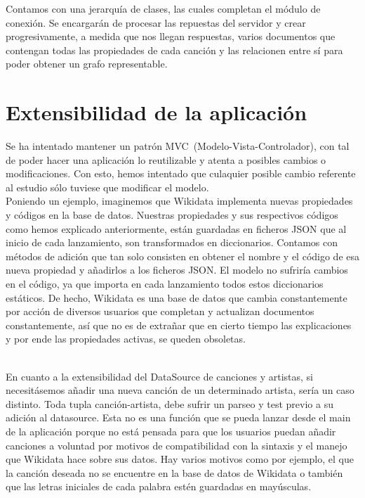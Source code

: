 Contamos con una jerarquía de clases, las cuales completan el módulo de conexión. Se encargarán de procesar las repuestas del servidor y crear progresivamente, a medida que nos llegan respuestas, varios documentos que contengan todas las propiedades de cada canción y las relacionen entre sí para poder obtener un grafo representable.\\

\section{Extensibilidad de la aplicación}

Se ha intentado mantener un patrón MVC~(Modelo-Vista-Controlador), con tal de poder hacer una aplicación lo reutilizable y atenta a posibles cambios o modificaciones. Con esto, hemos intentado que culaquier posible cambio referente al estudio sólo tuviese que modificar el modelo.\\

Poniendo un ejemplo, imaginemos que Wikidata implementa nuevas propiedades y códigos en la base de datos. Nuestras propiedades y sus respectivos códigos como hemos explicado anteriormente, están guardadas en ficheros JSON que al inicio de cada lanzamiento, son transformados en diccionarios. Contamos con métodos de adición que tan solo consisten en obtener el nombre y el código de esa nueva propiedad y añadirlos a los ficheros JSON. El modelo no sufriría cambios en el código, ya que importa en cada lanzamiento todos estos diccionarios estáticos. De hecho, Wikidata es una base de datos que cambia constantemente por acción de diversos usuarios que completan y actualizan documentos constantemente, así que no es de extrañar que en cierto tiempo las explicaciones y por ende las propiedades activas, se queden obsoletas.\\\

En cuanto a la extensibilidad del DataSource de canciones y artistas, si necesitásemos añadir una nueva canción de un determinado artista, sería un caso distinto. Toda tupla canción-artista, debe sufrir un parseo y test previo a su adición al datasource. Esta no es una función que se pueda lanzar desde el main de la aplicación porque no está pensada para que los usuarios puedan añadir canciones a voluntad por motivos de compatibilidad con la sintaxis y el manejo que Wikidata hace sobre sus datos. Hay varios motivos como por ejemplo, el que la canción deseada no se encuentre en la base de datos de Wikidata o también que las letras iniciales de cada palabra estén guardadas en mayúsculas.\\

